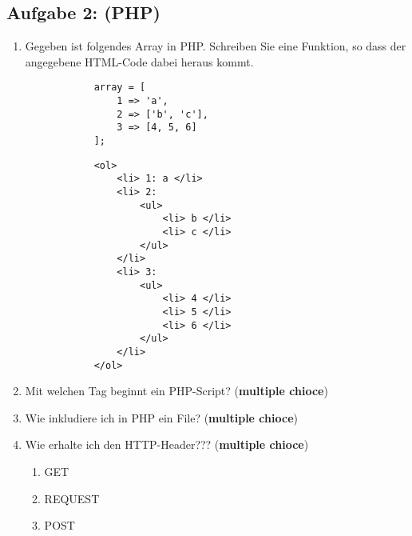 \subsection{Aufgabe 2: (PHP)}
\label{sec:Aufgabe2}
\begin{enumerate}[label=\alph*)]
    \item Gegeben ist folgendes Array in PHP. Schreiben Sie eine Funktion, so dass der angegebene HTML-Code dabei heraus kommt.
        \begin{verbatim}
            array = [
                1 => 'a',
                2 => ['b', 'c'],
                3 => [4, 5, 6]
            ];
        \end{verbatim}
    
        \begin{verbatim}
            <ol>
                <li> 1: a </li>
                <li> 2:
                    <ul>
                        <li> b </li>
                        <li> c </li>
                    </ul>
                </li>
                <li> 3:
                    <ul>
                        <li> 4 </li>
                        <li> 5 </li>
                        <li> 6 </li>
                    </ul>
                </li>
            </ol>
        \end{verbatim}
    \item Mit welchen Tag beginnt ein PHP-Script? (\textbf{multiple chioce})
    \item Wie inkludiere ich in PHP ein File? (\textbf{multiple chioce})
    \item Wie erhalte ich den HTTP-Header??? (\textbf{multiple chioce})
        \begin{enumerate}[label=\arabic*.]
            \item GET
            \item REQUEST
            \item POST
        \end{enumerate}
\end{enumerate}
